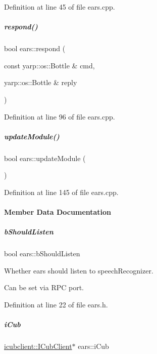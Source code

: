 Definition at line 45 of file ears.\+cpp.

\mbox{\label{group__ears_a8c7824b28cc3b9ff6c5e367a386d8176}} 
\subparagraph{\texorpdfstring{respond()}{respond()}}
{\footnotesize\ttfamily bool ears\+::respond (\begin{DoxyParamCaption}\item[{const yarp\+::os\+::\+Bottle \&}]{cmd,  }\item[{yarp\+::os\+::\+Bottle \&}]{reply }\end{DoxyParamCaption})}



Definition at line 96 of file ears.\+cpp.

\mbox{\label{group__ears_ae6ddc924bc901594ab56603aacb2b95f}} 
\subparagraph{\texorpdfstring{update\+Module()}{updateModule()}}
{\footnotesize\ttfamily bool ears\+::update\+Module (\begin{DoxyParamCaption}{ }\end{DoxyParamCaption})}



Definition at line 145 of file ears.\+cpp.



\paragraph{Member Data Documentation}
\mbox{\label{group__ears_a0b3923719b6591be0e03eb63157c5dfb}} 
\subparagraph{\texorpdfstring{b\+Should\+Listen}{bShouldListen}}
{\footnotesize\ttfamily bool ears\+::b\+Should\+Listen\hspace{0.3cm}{\ttfamily [protected]}}



Whether ears should listen to speech\+Recognizer. 

Can be set via R\+PC port. 

Definition at line 22 of file ears.\+h.

\mbox{\label{group__ears_aab2fe9913cd3b11ba5f35699de54b952}} 
\subparagraph{\texorpdfstring{i\+Cub}{iCub}}
{\footnotesize\ttfamily \hyperlink{group__icubclient__clients_classicubclient_1_1ICubClient}{icubclient\+::\+I\+Cub\+Client}$\ast$ ears\+::i\+Cub\hspace{0.3cm}{\ttfamily [protected]}}



